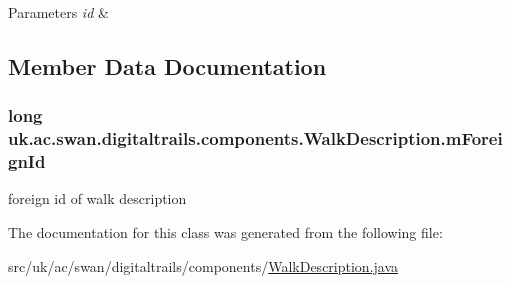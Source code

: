 \begin{DoxyParams}{Parameters}
{\em id} & \\
\hline
\end{DoxyParams}


\subsection{Member Data Documentation}
\hypertarget{classuk_1_1ac_1_1swan_1_1digitaltrails_1_1components_1_1_walk_description_ad6c63d9167c0f2a07c6a1f76cb4e5eb8}{
\subsubsection[{m\+Foreign\+Id}]{\setlength{\rightskip}{0pt plus 5cm}long uk.\+ac.\+swan.\+digitaltrails.\+components.\+Walk\+Description.\+m\+Foreign\+Id\hspace{0.3cm}{\ttfamily [protected]}}}\label{classuk_1_1ac_1_1swan_1_1digitaltrails_1_1components_1_1_walk_description_ad6c63d9167c0f2a07c6a1f76cb4e5eb8}


foreign id of walk description 



The documentation for this class was generated from the following file\+:\begin{DoxyCompactItemize}
\item 
src/uk/ac/swan/digitaltrails/components/\hyperlink{_walk_description_8java}{Walk\+Description.\+java}\end{DoxyCompactItemize}
